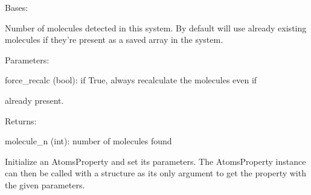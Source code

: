 \documentclass[letterpaper,10pt,english]{sphinxmanual}
\begin{document}

\begin{fulllineitems}
\label{doctree/soprano.properties.linkage.linkage:soprano.properties.linkage.linkage.MoleculeNumber}
Bases: {\hyperref[doctree/soprano.properties.atomsproperty:soprano.properties.atomsproperty.AtomsProperty]{}}

Number of molecules detected in this system. By default will use already
existing molecules if they're present as a saved array in the system.

\begin{DUlineblock}{0em}
\item[] Parameters:
\item[]
\begin{DUlineblock}{\DUlineblockindent}
\item[] force\_recalc (bool): if True, always recalculate the molecules even if
\item[]
\begin{DUlineblock}{\DUlineblockindent}
\item[] already present.
\end{DUlineblock}
\end{DUlineblock}
\end{DUlineblock}

\begin{DUlineblock}{0em}
\item[] Returns:
\item[]
\begin{DUlineblock}{\DUlineblockindent}
\item[] molecule\_n (int): number of molecules found
\end{DUlineblock}
\end{DUlineblock}

Initialize an AtomsProperty and set its parameters.
The AtomsProperty instance can then be called with a structure as its
only argument to get the property with the given parameters.


\end{fulllineitems}
\end{document}

